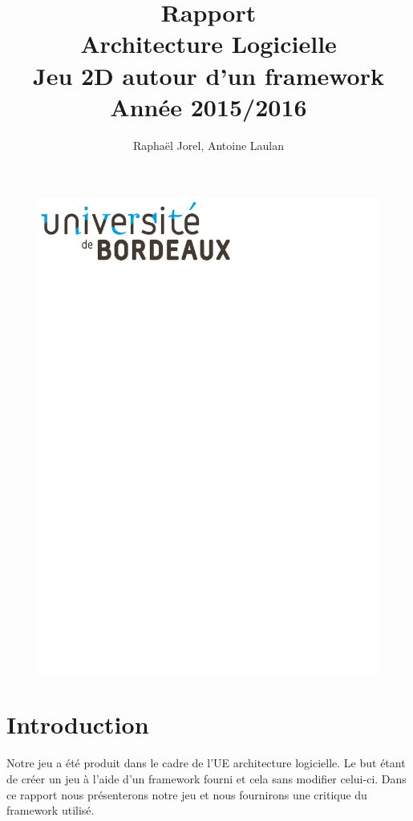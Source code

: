 \documentclass[a4paper,11pt]{article}
\title{Rapport\\Architecture Logicielle\\Jeu 2D autour d'un framework\\Année 2015/2016 }
\author{Raphaël Jorel, Antoine Laulan}
\begin{document}
\begin{figure}
    \begin{center}
    \includegraphics[scale=0.7]{images/logo-bdx.pdf}
    \end{center}
\end{figure}
\maketitle

\newpage
\tableofcontents
\newpage



\newpage
\section{Introduction }
Notre jeu a été produit dans le cadre de l'UE architecture logicielle. Le but étant de créer un jeu à l'aide d'un framework fourni et cela sans modifier celui-ci.
Dans ce rapport nous présenterons notre jeu et nous fournirons une critique du framework utilisé.
\end{document}
